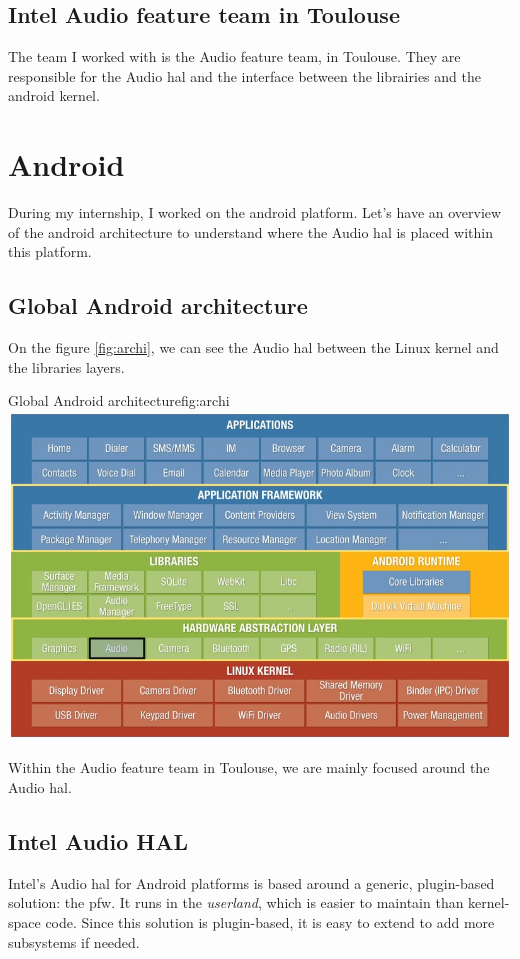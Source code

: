 \subsection{Intel Audio feature team in Toulouse}
The team I worked with is the Audio feature team, in Toulouse.
They are responsible for the Audio \gls{hal} and the interface between the
librairies and the \gls{android} \gls{kernel}.


\section{Android}
During my internship, I worked on the \gls{android} platform.
Let's have an overview of the \gls{android} architecture to understand where
the Audio \gls{hal} is placed within this platform.

\subsection{Global Android architecture}

On the figure \ref{fig:archi}, we can see the Audio \gls{hal} between the
Linux \gls{kernel} and the libraries layers.
\begin{figureGraphics}{Global Android architecture}{fig:archi}
\includegraphics[width=\textwidth]{./src/img/android-archi-audio-hal.jpeg}
\end{figureGraphics}

Within the Audio feature team in Toulouse, we are mainly focused around the Audio \gls{hal}.

\subsection{Intel Audio HAL}
Intel's Audio \gls{hal} for Android platforms is based around a generic, plugin-based solution: the \gls{pfw}.
It runs in the \emph{userland}, which is easier to maintain than kernel-space code.
Since this solution is plugin-based, it is easy to extend to add more subsystems if needed.


